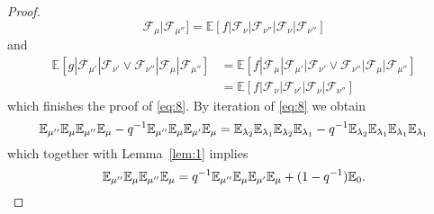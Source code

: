 \documentclass[a4paper]{amsart}
\newcommand{\EE}{\mathbb{E}}
\theoremstyle{plain}
\theoremstyle{definition}
\theoremstyle{remark}
\numberwithin{equation}{section}
\theoremstyle{plain}
\begin{document}
\begin{proof}
\begin{equation*}
      \mathcal{F}_{\mu} |  \mathcal{F}_{\mu''}]
    =\EE[f | \mathcal{F}_{\nu} | \mathcal{F}_{\nu''} | \mathcal{F}_{\nu} 
    | \mathcal{F}_{\nu''}]
  \end{equation*}
  and
  \begin{align*}
    \EE[g | \mathcal{F}_{\mu'} | \mathcal{F}_{\nu'} \vee \mathcal{F}_{\nu''} 
    | \mathcal{F}_{\mu} | \mathcal{F}_{\mu''}]
    & =\EE[f | \mathcal{F}_\mu | \mathcal{F}_{\mu'} |
       \mathcal{F}_{\nu'} \vee \mathcal{F}_{\nu''}  
      | \mathcal{F}_{\mu} | \mathcal{F}_{\mu''}] \\
    & = \EE[f | \mathcal{F}_{\nu} | \mathcal{F}_{\nu'} | \mathcal{F}_{\nu} 
    | \mathcal{F}_{\nu''}]
  \end{align*}
which finishes the proof of \eqref{eq:8}. By iteration of \eqref{eq:8} we obtain
\begin{equation*}
  \EE_{\mu''} \EE_{\mu} \EE_{\mu''} \EE_{\mu}
  - q^{-1} \EE_{\mu''} \EE_{\mu} \EE_{\mu'} \EE_{\mu}\\
  =
  \EE_{\lambda_2} \EE_{\lambda_1} \EE_{\lambda_2} \EE_{\lambda_1}
  - q^{-1} \EE_{\lambda_2} \EE_{\lambda_1} \EE_{\lambda_1} \EE_{\lambda_1}
\end{equation*}
which together with Lemma~\ref{lem:1} implies
\begin{equation*}
  \EE_{\mu''} \EE_{\mu} \EE_{\mu''} \EE_{\mu} = 
  q^{-1} \EE_{\mu''} \EE_{\mu} \EE_{\mu'}\EE_{\mu} + (1-q^{-1}) \EE_0.
	\qedhere
\end{equation*}
\end{proof}
\end{document}
